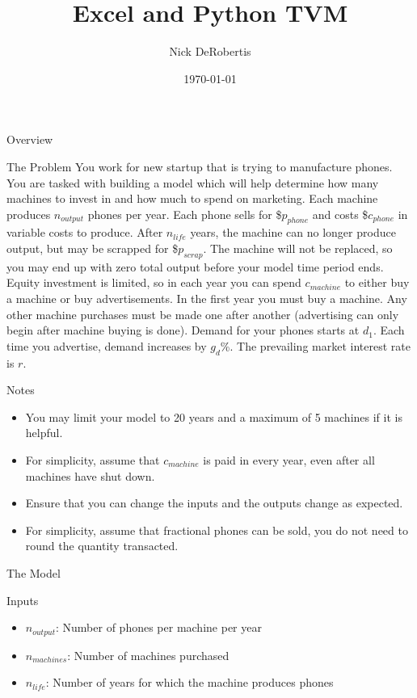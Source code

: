 \documentclass[]{article}
\begin{document}
\title{Excel and Python TVM}
\author{Nick DeRobertis}
\date{\today}
\maketitle
\begin{section}{Overview}
\begin{subsection}{The Problem}
You work for new startup that is trying to manufacture phones. You are tasked with building a model which will help determine how many machines to invest in and how much to spend on marketing. Each machine produces $n_{output}$ phones per year. Each phone sells for \$$p_{phone}$ and costs \$$c_{phone}$ in variable costs to produce. After $n_{life}$ years, the machine can no longer produce output, but may be scrapped for \$$p_{scrap}$. The machine will not be replaced, so you may end up with zero total output before your model time period ends. Equity investment is limited, so in each year you can spend $c_{machine}$ to either buy a machine or buy advertisements. In the first year you must buy a machine. Any other machine purchases must be made one after another (advertising can only begin after machine buying is done). Demand for your phones starts at $d_1$. Each time you advertise, demand increases by $g_d$\%. The prevailing market interest rate is $r$.
\end{subsection}
\begin{subsection}{Notes}
\begin{itemize}
\item You may limit your model to 20 years and a maximum of 5 machines if it is helpful.
\item For simplicity, assume that $c_{machine}$ is paid in every year, even after all machines have shut down.
\item Ensure that you can change the inputs and the outputs change as expected.
\item For simplicity, assume that fractional phones can be sold, you do not need to round the quantity transacted.
\end{itemize}
\end{subsection}
\begin{subsection}{The Model}
\begin{subsubsection}{Inputs}
\begin{itemize}
\item $n_{output}$: Number of phones per machine per year
\item $n_{machines}$: Number of machines purchased
\item $n_{life}$: Number of years for which the machine produces phones

\end{itemize}
\end{subsubsection}
\end{subsection}
\end{section}
\end{document}
